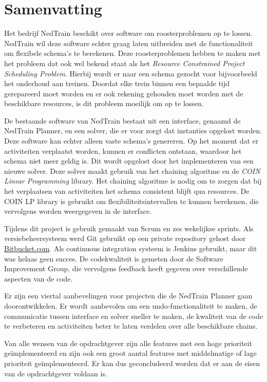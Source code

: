 \section*{Samenvatting}
Het bedrijf NedTrain beschikt over software om roosterproblemen op te lossen. NedTrain wil deze software echter graag laten uitbreiden met de functionaliteit om flexibele schema's te berekenen. Deze roosterproblemen hebben te maken met het probleem dat ook wel bekend staat als het \emph{Resource Constrained Project Scheduling Problem}. Hierbij wordt er naar een schema gezocht voor bijvoorbeeld het onderhoud aan treinen. Doordat elke trein binnen een bepaalde tijd gerepareerd moet worden en er ook rekening gehouden moet worden met de beschikbare resources, is dit probleem moeilijk om op te lossen.

De bestaande software van NedTrain bestaat uit een interface, genaamd de NedTrain Planner, en een solver, die er voor zorgt dat instanties opgelost worden. Deze software kan echter alleen vaste schema's genereren. Op het moment dat er activiteiten verplaatst worden, kunnen er conflicten ontstaan, waardoor het schema niet meer geldig is. Dit wordt opgelost door het implementeren van een nieuwe solver. Deze solver maakt gebruik van het chaining algoritme en de \emph{COIN Linear Programming} library. Het chaining algoritme is nodig om te zorgen dat bij het verplaatsen van activiteiten het schema consistent blijft qua resources. De COIN LP library is gebruikt om flexibiliteitsintervallen te kunnen berekenen, die vervolgens worden weergegeven in de interface. 

Tijdens dit project is gebruik gemaakt van Scrum en zes wekelijkse sprints. Als versiebeheersysteem werd Git gebruikt op een private repository gehost door \href{http://bitbucket.com}{Bitbucket.com}. Als continuous integration systeem is Jenkins gebruikt, maar dit was helaas geen succes. De codekwaliteit is gemeten door de Software Improvement Group, die vervolgens feedback heeft gegeven over verschillende aspecten van de code. 

Er zijn een viertal aanbevelingen voor projecten die de NedTrain Planner gaan doorontwikkelen. Er wordt aanbevolen om een undo-functionaliteit te maken, de communicatie tussen interface en solver sneller te maken, de kwaliteit van de code te verbeteren en activiteiten beter te laten verdelen over alle beschikbare chains.

Van alle wensen van de opdrachtgever zijn alle features met een hoge prioriteit ge\"implementeerd en zijn ook een groot aantal features met middelmatige of lage prioriteit ge\"implementeerd. Er kan dus geconcludeerd worden dat er aan de eisen van de opdrachtgever voldaan is.
